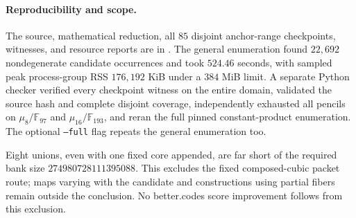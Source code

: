 \paragraph{Reproducibility and scope.}
The source, mathematical reduction, all $85$ disjoint anchor-range
checkpoints, witnesses, and resource reports are in
.
The general enumeration found $22{,}692$ nondegenerate candidate
occurrences and took $524.46$ seconds, with sampled peak process-group
RSS $176{,}192$ KiB under a $384$ MiB limit. A separate Python checker
verified every checkpoint witness on the entire domain, validated the
source hash and complete disjoint coverage, independently exhausted all
pencils on $\mu_8/\mathbb F_{97}$ and $\mu_{16}/\mathbb F_{193}$,
and reran the full pinned constant-product enumeration. The optional
\texttt{--full} flag repeats the general enumeration too.

Eight unions, even with one fixed core appended, are far short of
the required bank size $274980728111395088$. This excludes the fixed
composed-cubic packet route; maps varying with the candidate and
constructions using partial fibers remain outside the conclusion.
No better.codes score improvement follows from this exclusion.
